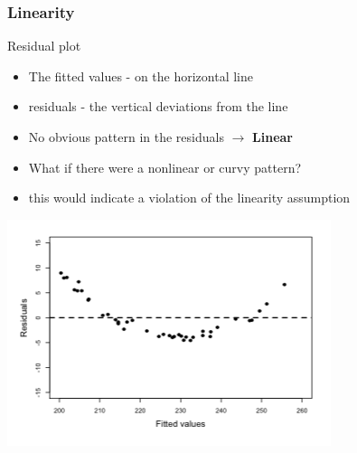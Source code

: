 \documentclass[10p]{beamer}\usepackage[]{graphicx}\usepackage[]{color}
\begin{document}
\begin{frame}
\frametitle{Linearity}
Residual plot
\begin{itemize}
\item The fitted values - on the horizontal line
\item residuals - the vertical deviations from the line
\item \alert{No obvious pattern} in the residuals $\rightarrow$ \textbf{Linear}
\pause
\item What if there were a nonlinear or curvy pattern?
\item this would indicate a violation of the linearity assumption
\end{itemize}
\begin{center}
\includegraphics[scale=.4]{figure/fig1}
\end{center}
\end{frame}
\end{document}
